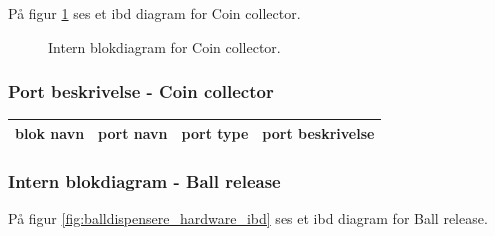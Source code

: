 \documentclass[Arkitektur/System_main.tex]{subfiles}
\begin{document}
På figur \ref{fig:coin_collector_hardware_ibd} ses et ibd diagram for Coin collector.

\begin{figure}[H]
    \centering
    \caption{Intern blokdiagram for Coin collector.}
    \label{fig:coin_collector_hardware_ibd}
\end{figure}

\subsubsection{Port beskrivelse - Coin collector} \label{sec:coin_collector_hardware_ports}


\begin{table}[H]
\begin{tabular}{|l|l|l|l|}
\hline
blok navn & port navn & port type & port beskrivelse \\ \hline
\end{tabular}
\end{table}


\subsubsection{Intern blokdiagram - Ball release} \label{sec:ball_release_hardware_ibd}

På figur \ref{fig:balldispensere_hardware_ibd} ses et ibd diagram for Ball release.
\end{document}

